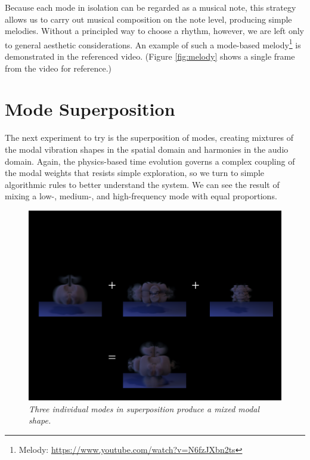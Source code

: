 Because each mode in isolation can be regarded as a musical note, this strategy allows us to carry out musical composition on the note level, producing simple melodies. Without a principled way to choose a rhythm,
however, we are left only to general aesthetic considerations. An example of such a mode-based melody\footnote{Melody: \url{https://www.youtube.com/watch?v=N6fzJXbn2ts}} is demonstrated in the referenced video. (Figure \ref{fig:melody} shows a single 
frame from the video for reference.)

\section{Mode Superposition}
The next experiment to try is the superposition of modes, creating mixtures of the modal vibration shapes in the spatial domain and harmonies in the audio domain. Again, the physics-based time evolution governs a complex coupling of the modal weights that resists simple exploration, so we turn to simple algorithmic rules to better understand the system. We can see the result of mixing a low-, medium-, and high-frequency mode with equal proportions.

\begin{figure}[H]
	\centering
	\includegraphics[width=\textwidth]{chap6/figures/superposition.png}
	\caption{\em Three individual modes in superposition produce a mixed modal shape.}
\label{fig:superposition}
\end{figure}

